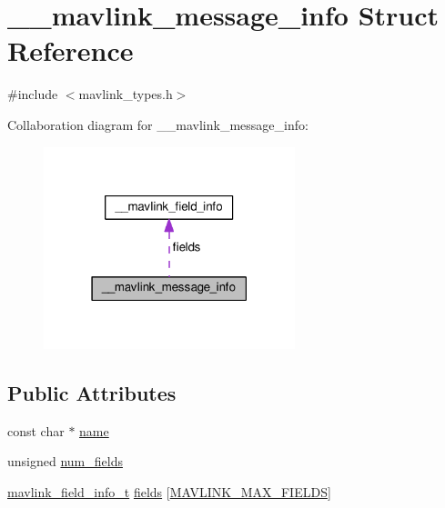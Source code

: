 \hypertarget{struct____mavlink__message__info}{}\section{\+\_\+\+\_\+mavlink\+\_\+message\+\_\+info Struct Reference}
\label{struct____mavlink__message__info}


{\ttfamily \#include $<$mavlink\+\_\+types.\+h$>$}



Collaboration diagram for \+\_\+\+\_\+mavlink\+\_\+message\+\_\+info\+:
\nopagebreak
\begin{figure}[H]
\begin{center}
\leavevmode
\includegraphics[width=207pt]{struct____mavlink__message__info__coll__graph}
\end{center}
\end{figure}
\subsection*{Public Attributes}
\begin{DoxyCompactItemize}
\item 
const char $\ast$ \hyperlink{struct____mavlink__message__info_a5e8b48c51cb8bc44bd844d1c3049ee32}{name}
\item 
unsigned \hyperlink{struct____mavlink__message__info_a0c343bcc1f27884e8c2ab875e7efc2e5}{num\+\_\+fields}
\item 
\hyperlink{mavlink__types_8h_a00291ed73cb08731cbcccb8dc974ac95}{mavlink\+\_\+field\+\_\+info\+\_\+t} \hyperlink{struct____mavlink__message__info_a4a15f20958b43cb1282575c6da67a37b}{fields} \mbox{[}\hyperlink{mavlink__types_8h_a27984b8945d505a56168731dc3cac63a}{M\+A\+V\+L\+I\+N\+K\+\_\+\+M\+A\+X\+\_\+\+F\+I\+E\+L\+DS}\mbox{]}
\end{DoxyCompactItemize}


